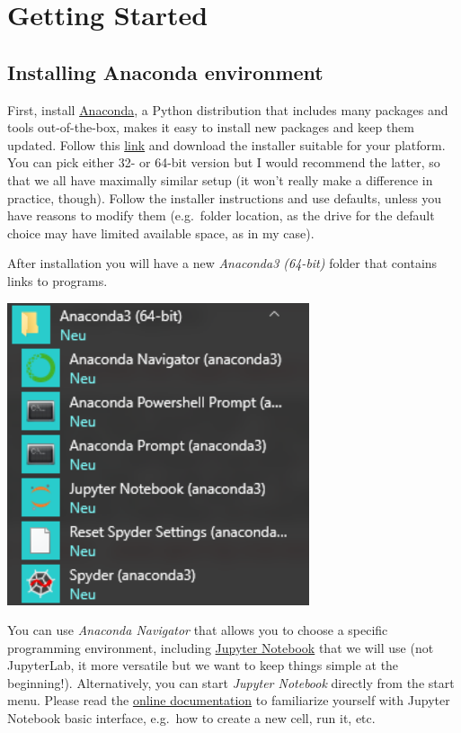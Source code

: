 \documentclass[
]{book}
\begin{document}
\hypertarget{getting-started}{%
\chapter*{Getting Started}\label{getting-started}}

\hypertarget{install-anaconda}{%
\section*{Installing Anaconda environment}\label{install-anaconda}}

First, install \href{https://www.anaconda.com}{Anaconda}, a Python distribution that includes many packages and tools out-of-the-box, makes it easy to install new packages and keep them updated. Follow this \href{https://www.anaconda.com/products/individual}{link} and download the installer suitable for your platform. You can pick either 32- or 64-bit version but I would recommend the latter, so that we all have maximally similar setup (it won't really make a difference in practice, though). Follow the installer instructions and use defaults, unless you have reasons to modify them (e.g.~folder location, as the drive for the default choice may have limited available space, as in my case).

After installation you will have a new \emph{Anaconda3 (64-bit)} folder that contains links to programs.

\includegraphics[width=3.5in]{images/anaconda-shortcuts}

You can use \emph{Anaconda Navigator} that allows you to choose a specific programming environment, including \href{https://jupyter.org/}{Jupyter Notebook} that we will use (not JupyterLab, it more versatile but we want to keep things simple at the beginning!). Alternatively, you can start \emph{Jupyter Notebook} directly from the start menu. Please read the \href{https://jupyter-notebook.readthedocs.io/en/stable/examples/Notebook/examples_index.html}{online documentation} to familiarize yourself with Jupyter Notebook basic interface, e.g.~how to create a new cell, run it, etc.
\end{document}

